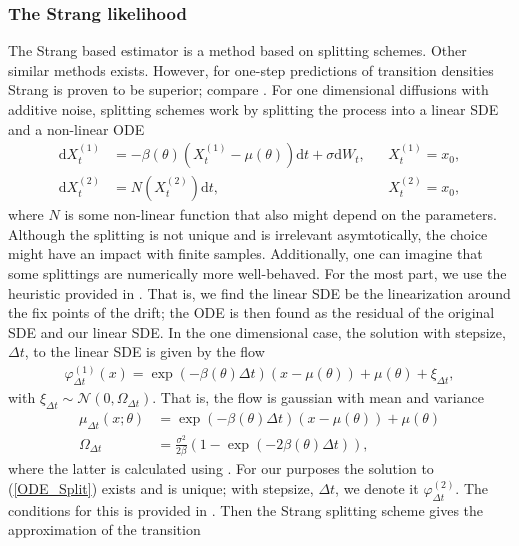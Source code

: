 \subsubsection{The Strang likelihood}
The Strang based estimator is a method based on splitting schemes. Other similar methods exists. However, for one-step predictions of transition densities Strang is proven to be superior; compare \cite[Proposition 3.4 and 3.6]{SplittingSchemes}. For one dimensional diffusions with additive noise, splitting schemes work by splitting the process into a linear SDE and a non-linear ODE
\begin{align}
    \mathrm{d}X_t^{(1)} &= -\beta(\theta)\left(X_t^{(1)} - \mu(\theta)\right)\mathrm{d}t + \sigma \mathrm{d}W_t, &&X_t^{(1)} = x_0, \\
    \mathrm{d}X_t^{(2)} &= N\left(X_t^{(2)}\right)\mathrm{d}t, &&X_t^{(2)} = x_0, \label{ODE_Split}
\end{align}
where $N$ is some non-linear function that also might depend on the parameters. Although the splitting is not unique and is irrelevant asymtotically, the choice might have an impact with finite samples. Additionally, one can imagine that some splittings are numerically more well-behaved. For the most part, we use the heuristic provided in \cite[section 2.3 and 2.5]{SplittingSchemes}. That is, we find the linear SDE be the linearization around the fix points of the drift; the ODE is then found as the residual of the original SDE and our linear SDE. In the one dimensional case, the solution with stepsize, $\Delta t$, to the linear SDE is given by the flow
\begin{align}
    \varphi_{\Delta t}^{(1)}(x) = \exp\left(-\beta\left(\theta\right) \Delta t\right)\left(x - \mu\left(\theta\right)\right) + \mu\left(\theta\right) + \xi_{\Delta t},
\end{align}
with $\xi_{\Delta t}\sim\mathcal{N}\left(0, \Omega_{\Delta t}\right)$. That is, the flow is gaussian with mean and variance
\begin{align}
    \mu_{\Delta t}(x; \theta) &= \exp\left(-\beta\left(\theta\right) \Delta t\right)\left(x - \mu\left(\theta\right)\right) + \mu\left(\theta\right) \label{linearSDEMean}\\
    \Omega_{\Delta t} &= \frac{\sigma^2}{2\beta}\left(1 - \exp\left(-2\beta\left(\theta\right)\Delta t\right)\right), \label{linearSDEVariance}
\end{align}
where the latter is calculated using \cite[equation (6)]{SplittingSchemes}. For our purposes the solution to (\ref{ODE_Split}) exists and is unique; with stepsize, $\Delta t$, we denote it $\varphi_{\Delta t}^{(2)}$. The conditions for this is provided in \cite[Assumption (A1) and - (A2)]{SplittingSchemes}. Then the Strang splitting scheme gives the approximation of the transition
